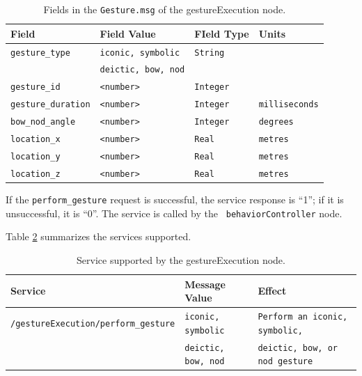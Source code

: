 \documentclass{CSSRforAfrica}
\begin{document}
\begin{longtable}[c]{|l|l|l|l|}
    \caption{Fields in the \texttt{Gesture.msg} of the gestureExecution node.} \label{tab:Gesture.msg_field} \\
    \hline
    \rowcolor{gray!30}
    \footnotesize{\textbf{Field}} & \footnotesize{\textbf{Field Value}} & \footnotesize{\textbf{FIeld Type}} & \footnotesize{\textbf{Units}}\\ \hline
    \endhead %
    
    \footnotesize{\texttt{gesture\_type}} & \footnotesize{\texttt{iconic, symbolic}} & \footnotesize{\texttt{String}} & \footnotesize{}  \\ 
   \footnotesize{} & \footnotesize{\texttt{deictic, bow, nod}} & \footnotesize{} & \footnotesize{}  \\\hline
\footnotesize{\texttt{gesture\_id}} & \footnotesize{\texttt{<number>}} & \footnotesize{\texttt{Integer}} & \footnotesize{}  \\ \hline
\footnotesize{\texttt{gesture\_duration}} & \footnotesize{\texttt{<number>}} & \footnotesize{\texttt{Integer}} & \footnotesize{\texttt{milliseconds}}  \\ \hline
\footnotesize{\texttt{bow\_nod\_angle}} & \footnotesize{\texttt{<number>}} & \footnotesize{\texttt{Integer}} & \footnotesize{\texttt{degrees}}  \\ \hline
\footnotesize{\texttt{location\_x}} & \footnotesize{\texttt{<number>}} & \footnotesize{\texttt{Real}} & \footnotesize{\texttt{metres}}  \\ \hline
\footnotesize{\texttt{location\_y}} & \footnotesize{\texttt{<number>}} & \footnotesize{\texttt{Real}} & \footnotesize{\texttt{metres}}  \\ \hline
\footnotesize{\texttt{location\_z}} & \footnotesize{\texttt{<number>}} & \footnotesize{\texttt{Real}} & \footnotesize{\texttt{metres}}  \\ \hline
\end{longtable}

If the \texttt{perform\_gesture} request is successful, the service response is “1”; if it is unsuccessful, it is “0”. The service is called by the \texttt{ behaviorController} node.

Table \ref{tab:Supported_services} summarizes the services supported.

\begin{longtable}[c]{|l|l|l|}
    \caption{Service supported by the gestureExecution node.} \label{tab:Supported_services} \\
    \hline
    \rowcolor{gray!30}
    \footnotesize{\textbf{Service}} & \footnotesize{\textbf{Message Value}} & \footnotesize{\textbf{Effect}} \\ \hline
    \endhead %
    
   \footnotesize{\texttt{/gestureExecution/perform\_gesture}} & \footnotesize{\texttt{iconic, symbolic}} &  \footnotesize{\texttt{Perform an iconic, symbolic,}}  \\ 
   \footnotesize{} & \footnotesize{\texttt{deictic, bow, nod}} & \footnotesize{\texttt{deictic, bow, or nod gesture}}  \\\hline
\end{longtable}
\end{document}
